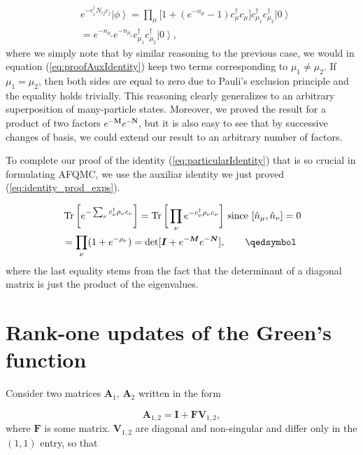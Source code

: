 \begin{equation}
\begin{split}
&e^{-c_i^\dagger N_{ij} c_j} \left| \phi \right\rangle = \prod_\mu \bigg[ 1 + (e^{-n_\mu} -1 ) c_\mu^\dagger c_\mu \bigg] c_{\mu_1}^\dagger c_{\mu_2}^\dagger \left| 0 \right\rangle \\
&= e^{-n_{\mu_1}} e^{-n_{\mu_2}} c_{\mu_1}^\dagger c_{\mu_2}^\dagger \left| 0 \right\rangle ,
\end{split}
\end{equation}
where we simply note that by similar reasoning to the previous case, we would in equation (\ref{eq:proofAuxIdentity}) keep two terms corresponding to $\mu_1 \neq \mu_2$. If $\mu_1 = \mu_2$, then both sides are equal to zero due to Pauli's exclusion principle and the equality holds trivially. This reasoning clearly generalizes to an arbitrary superposition of many-particle states. Moreover, we proved the result for a product of two factors $e^{-\bm M} e^{-\bm N}$, but it is also easy to see that by successive changes of basis, we could extend our result to an arbitrary number of factors.

To complete our proof of the identity (\ref{eq:particularIdentity}) that is so crucial in formulating AFQMC, we use the auxiliar identity we just proved (\ref{eq:identity_prod_exps}).

\begin{equation}\label{eq:completeProof}
\begin{split}
&\Tr \bigg[ e^{-\sum_\nu c_\nu^\dagger \rho_\nu c_\nu} \bigg] = \Tr \bigg[ \prod_\nu e^{-c_\nu^\dagger \rho_\nu c_\nu } \bigg] \text{  since  } [\hat{n}_\mu, \hat{n}_\nu] = 0 \\
&= \prod_\nu ( 1 + e^{-\rho_\nu} ) = \text{det} [ \bm I + e^{-\bm M} e^{-\bm N} ], \quad\quad \qedsymbol
\end{split}
\end{equation}
where the last equality stems from the fact that the determinant of a diagonal matrix is just the product of the eigenvalues.

\section{Rank-one updates of the Green's function}\label{sec:greenUpdate}

Consider two matrices $\bm A_1$, $\bm A_2$ written in the form

\begin{equation}
\bm A_{1,2} = \bm I + \bm F \bm V_{1,2} ,
\end{equation}
where $\bm F$ is some matrix. $\bm V_{1,2}$ are diagonal and non-singular and differ only in the $(1,1)$ entry, so that

